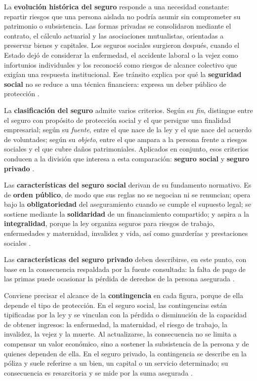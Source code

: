 \documentclass[12pt,letterpaper,oneside]{article}
\begin{document}
La \textbf{evoluci\'on hist\'orica del seguro} responde a una necesidad constante: repartir riesgos que una persona aislada no podr\'ia asumir sin comprometer su patrimonio o subsistencia. Las formas privadas se consolidaron mediante el contrato, el c\'alculo actuarial y las asociaciones mutualistas, orientadas a preservar bienes y capitales. Los seguros sociales surgieron despu\'es, cuando el Estado dej\'o de considerar la enfermedad, el accidente laboral o la vejez como infortunios individuales y los reconoci\'o como riesgos de alcance colectivo que exig\'ian una respuesta institucional. Ese tr\'ansito explica por qu\'e la \textbf{seguridad social} no se reduce a una t\'ecnica financiera: expresa un deber p\'ublico de protecci\'on \citep{bricenoRuiz2011,belmontParra2017,perezSotoCalderon2012}.

La \textbf{clasificaci\'on del seguro} admite varios criterios. Seg\'un su \emph{fin}, distingue entre el seguro con prop\'osito de protecci\'on social y el que persigue una finalidad empresarial; seg\'un su \emph{fuente}, entre el que nace de la ley y el que nace del acuerdo de voluntades; seg\'un su \emph{objeto}, entre el que ampara a la persona frente a riesgos sociales y el que cubre da\~nos patrimoniales. Aplicados en conjunto, esos criterios conducen a la divisi\'on que interesa a esta comparaci\'on: \textbf{seguro social} y \textbf{seguro privado} \citep{bricenoRuiz2011,leyContratoSeguro2026}.

Las \textbf{caracter\'isticas del seguro social} derivan de su fundamento normativo. Es de \textbf{orden p\'ublico}, de modo que sus reglas no se negocian ni se renuncian; opera bajo la \textbf{obligatoriedad} del aseguramiento cuando se cumple el supuesto legal; se sostiene mediante la \textbf{solidaridad} de un financiamiento compartido; y aspira a la \textbf{integralidad}, porque la ley organiza seguros para riesgos de trabajo, enfermedades y maternidad, invalidez y vida, as\'i como guarder\'ias y prestaciones sociales \citep{lss2026,bricenoRuiz2011}.

Las \textbf{caracter\'isticas del seguro privado} deben describirse, en este punto, con base en la consecuencia respaldada por la fuente consultada: la falta de pago de las primas puede ocasionar la p\'erdida de derechos de la persona asegurada \citep{bricenoRuiz2011}.

Conviene precisar el alcance de la \textbf{contingencia} en cada figura, porque de ella depende el tipo de protecci\'on. En el seguro social, las contingencias est\'an tipificadas por la ley y se vinculan con la p\'erdida o disminuci\'on de la capacidad de obtener ingresos: la enfermedad, la maternidad, el riesgo de trabajo, la invalidez, la vejez y la muerte. Al actualizarse, la consecuencia no se limita a compensar un valor econ\'omico, sino a sostener la subsistencia de la persona y de quienes dependen de ella. En el seguro privado, la contingencia se describe en la p\'oliza y suele referirse a un bien, un capital o un servicio determinado; su consecuencia es resarcitoria y se mide por la suma asegurada \citep{bricenoRuiz2011,leyContratoSeguro2026,belmontParra2017}.
\end{document}
